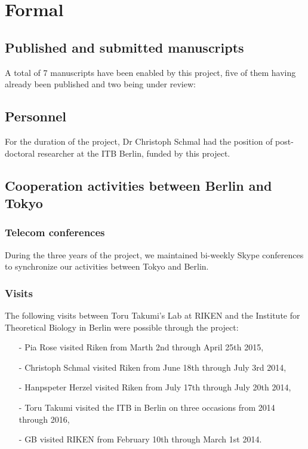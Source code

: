 \documentclass[a4paper]{article}
\begin{document}








\section{Formal}

\subsection{Published and submitted manuscripts}
A total of 7 manuscripts have been enabled by this project, five of
them having already been published and two being under review:
\cite{bordyugov2015tuning,schmal2015theoretical,kondoff2015modeling,schmal2017moran,wagner2017plant,myung2017choroid,schmal2017measuring}


\subsection{Personnel}
For the duration of the project, Dr Christoph Schmal had the position
of post-doctoral researcher at the ITB Berlin, funded by this project.

\subsection{Cooperation activities between Berlin and Tokyo}

\subsubsection{Telecom conferences}
During the three years of the project, we maintained bi-weekly Skype
conferences to synchronize our activities between Tokyo and Berlin.

\subsubsection{Visits}
The following visits between Toru Takumi's Lab at RIKEN and the
Institute for Theoretical Biology in Berlin were possible through the
project:
\begin{itemize}
  \item[-] Pia Rose visited Riken from Marth 2nd through April 25th 2015,
  \item[-] Christoph Schmal visited Riken from June 18th through July 3rd
  2014,
  \item[-] Hanpspeter Herzel visited Riken from July 17th through July
  20th 2014,
  \item[-] Toru Takumi visited the ITB in Berlin on three occasions from
  2014 through 2016,
  \item[-] GB visited RIKEN from February 10th through March 1st 2014.
\end{itemize}
\end{document}
